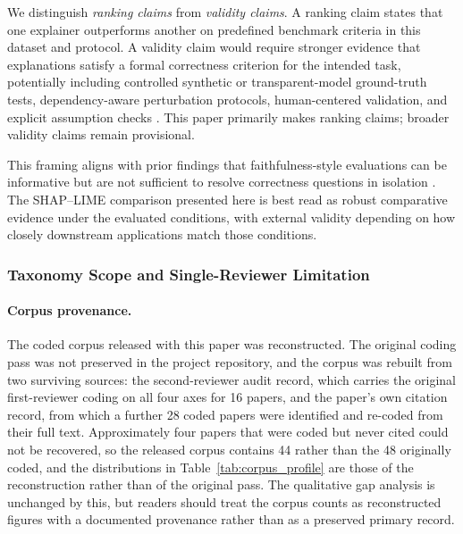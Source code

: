 \documentclass[10pt,a4paper,twoside]{article}
\begin{document}
We distinguish \emph{ranking claims} from \emph{validity claims}. A
ranking claim states that one explainer outperforms another on predefined
benchmark criteria in this dataset and protocol. A validity claim would
require stronger evidence that explanations satisfy a formal correctness
criterion for the intended task, potentially including controlled
synthetic or transparent-model ground-truth tests, dependency-aware
perturbation protocols, human-centered validation, and explicit assumption checks
\citep{haufe2026formalization,doshivelez2017rigorous}. This paper
primarily makes ranking claims; broader validity claims remain provisional.

This framing aligns with prior findings that faithfulness-style evaluations
can be informative but are not sufficient to resolve correctness questions
in isolation \citep{jacovi2020faithfulness,adebayo2018sanity,
hooker2019benchmark,rong2022consistent}. The SHAP--LIME comparison
presented here is best read as robust comparative evidence under the
evaluated conditions, with external validity depending on how closely
downstream applications match those conditions.

\subsubsection{Taxonomy Scope and Single-Reviewer Limitation}

\paragraph{Corpus provenance.} The coded corpus released with this paper was
reconstructed. The original coding pass was not preserved in the project
repository, and the corpus was rebuilt from two surviving sources: the
second-reviewer audit record, which carries the original first-reviewer coding
on all four axes for 16 papers, and the paper's own citation record, from which
a further 28 coded papers were identified and re-coded from their full text.
Approximately four papers that were coded but never cited could not be
recovered, so the released corpus contains 44 rather than the 48 originally
coded, and the distributions in Table~\ref{tab:corpus_profile} are those of the
reconstruction rather than of the original pass. The qualitative gap analysis is
unchanged by this, but readers should treat the corpus counts as reconstructed
figures with a documented provenance rather than as a preserved primary record.
\end{document}
